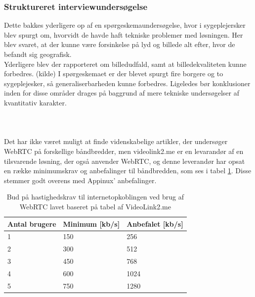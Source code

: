 \subsubsection{Struktureret interviewundersøgelse}
Dette bakkes yderligere op af en spørgeskemaundersøgelse, hvor i sygeplejersker blev spurgt om, hvorvidt de havde haft tekniske problemer med løsningen. Her blev svaret, at der kunne være forsinkelse på lyd og billede alt efter, hvor de befandt sig geografisk.\\Yderligere blev der rapporteret om billedudfald, samt at billedekvaliteten kunne forbedres. (kilde) I spørgeskemaet er der blevet spurgt fire borgere og to sygeplejesker, så generaliserbarheden kunne forbedres. Ligeledes bør konklusioner inden for disse områder drages på baggrund af mere tekniske undersøgelser af kvantitativ karakter.\\ \\
\\ \\
Det har ikke været muligt at finde videnskabelige artikler, der undersøger WebRTC på forskellige båndbredder, men videolink2.me er en levarandør af en tilsvarende løsning, der også anvender WebRTC, og denne leverandør har opsat en række minimumskrav og anbefalinger til båndbredden, som ses i tabel \ref{tab:hastighedtabel}. Disse stemmer godt overens med Appinux' anbefalinger.
\begin{table}[H]
\caption{Bud på hastighedskrav til internetopkoblingen ved brug af WebRTC lavet baseret på tabel af VideoLink2.me\cite{videolink2me}}
\label{tab:hastighedtabel}
\centering
\begin{tabular}{|l|l|l|}
\hline
\cellcolor{blue!25}\textbf{Antal brugere} & \cellcolor{blue!25}\textbf{Minimum} [kb/s]  & \cellcolor{blue!25}\textbf{Anbefalet}  [kb/s] \\ \hline
1             & 150          & 256          \\ \hline
2             & 300          & 512          \\ \hline
3             & 450          & 768          \\ \hline
4             & 600          & 1024          \\ \hline
5             & 750          & 1280          \\ \hline
\end{tabular}

\end{table}
